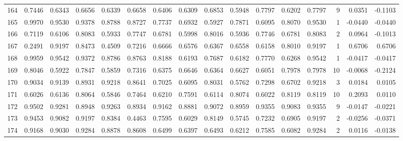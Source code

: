 \begin{tabular}{lrrrrrrrrrrrrrrr}
164 &      0.7446 &  0.6343 &  0.6656 &  0.6339 &  0.6658 &  0.6406 &  0.6309 &  0.6853 &  0.5948 &  0.7797 &   0.6202 &     0.7797 &      9 &                    0.0351 &                    -0.1103 \\
165 &      0.9970 &  0.9530 &  0.9378 &  0.8788 &  0.8727 &  0.7737 &  0.6932 &  0.5927 &  0.7871 &  0.6095 &   0.8070 &     0.9530 &      1 &                   -0.0440 &                    -0.0440 \\
166 &      0.7119 &  0.6106 &  0.8083 &  0.5933 &  0.7747 &  0.6781 &  0.5998 &  0.8016 &  0.5936 &  0.7746 &   0.6781 &     0.8083 &      2 &                    0.0964 &                    -0.1013 \\
167 &      0.2491 &  0.9197 &  0.8473 &  0.4509 &  0.7216 &  0.6666 &  0.6576 &  0.6367 &  0.6558 &  0.6158 &   0.8010 &     0.9197 &      1 &                    0.6706 &                     0.6706 \\
168 &      0.9959 &  0.9542 &  0.9372 &  0.8786 &  0.8763 &  0.8188 &  0.6193 &  0.7687 &  0.6182 &  0.7770 &   0.6268 &     0.9542 &      1 &                   -0.0417 &                    -0.0417 \\
169 &      0.8046 &  0.5922 &  0.7847 &  0.5859 &  0.7316 &  0.6375 &  0.6646 &  0.6364 &  0.6627 &  0.6051 &   0.7978 &     0.7978 &     10 &                   -0.0068 &                    -0.2124 \\
170 &      0.9034 &  0.9139 &  0.8931 &  0.9218 &  0.8641 &  0.7025 &  0.6095 &  0.8031 &  0.5762 &  0.7298 &   0.6702 &     0.9218 &      3 &                    0.0184 &                     0.0105 \\
171 &      0.6026 &  0.6136 &  0.8064 &  0.5846 &  0.7464 &  0.6210 &  0.7591 &  0.6114 &  0.8074 &  0.6022 &   0.8119 &     0.8119 &     10 &                    0.2093 &                     0.0110 \\
172 &      0.9502 &  0.9281 &  0.8948 &  0.9263 &  0.8934 &  0.9162 &  0.8881 &  0.9072 &  0.8959 &  0.9355 &   0.9083 &     0.9355 &      9 &                   -0.0147 &                    -0.0221 \\
173 &      0.9453 &  0.9082 &  0.9197 &  0.8384 &  0.4463 &  0.7595 &  0.6029 &  0.8149 &  0.5745 &  0.7232 &   0.6905 &     0.9197 &      2 &                   -0.0256 &                    -0.0371 \\
174 &      0.9168 &  0.9030 &  0.9284 &  0.8878 &  0.8608 &  0.6499 &  0.6397 &  0.6493 &  0.6212 &  0.7585 &   0.6082 &     0.9284 &      2 &                    0.0116 &                    -0.0138 \\

\end{tabular}
